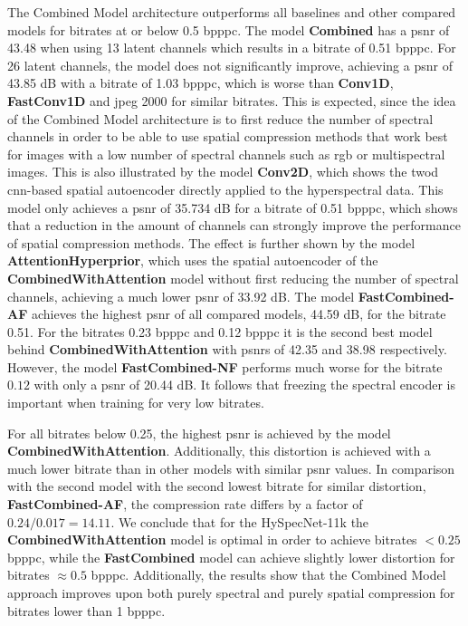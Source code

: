 The Combined Model architecture outperforms all baselines and other compared models for bitrates at or below 0.5 \ac{bpppc}. The model \textbf{Combined} has a \ac{psnr} of 43.48 when using 13 latent channels which results in a bitrate of 0.51 \ac{bpppc}. For 26 latent channels, the model does not significantly improve, achieving a \ac{psnr} of 43.85 dB with a bitrate of 1.03 \ac{bpppc}, which is worse than \textbf{Conv1D}, \textbf{FastConv1D} and \ac{jpeg} 2000 for similar bitrates. This is expected, since the idea of the Combined Model architecture is to first reduce the number of spectral channels in order to be able to use spatial compression methods that work best for images with a low number of spectral channels such as \ac{rgb} or multispectral images. This is also illustrated by the model \textbf{Conv2D}, which shows the \ac{twod} \ac{cnn}-based spatial autoencoder directly applied to the hyperspectral data. This model only achieves a \ac{psnr} of 35.734 dB for a bitrate of 0.51 \ac{bpppc}, which shows that a reduction in the amount of channels can strongly improve the performance of spatial compression methods. The effect is further shown by the model \textbf{AttentionHyperprior}, which uses the spatial autoencoder of the \textbf{CombinedWithAttention} model without first reducing the number of spectral channels, achieving a much lower \ac{psnr} of 33.92 dB. The model \textbf{FastCombined-AF} achieves the highest \ac{psnr} of all compared models, 44.59 dB, for the bitrate 0.51. For the bitrates 0.23 \ac{bpppc} and 0.12 \ac{bpppc} it is the second best model behind \textbf{CombinedWithAttention} with \acp{psnr} of 42.35 and 38.98 respectively. However, the model \textbf{FastCombined-NF} performs much worse for the bitrate $0.12$ with only a \ac{psnr} of 20.44 dB. It follows that freezing the spectral encoder is important when training for very low bitrates.

For all bitrates below 0.25, the highest \ac{psnr} is achieved by the model \textbf{CombinedWithAttention}. Additionally, this distortion is achieved with a much lower bitrate than in other models with similar \ac{psnr} values. In comparison with the second model with the second lowest bitrate for similar distortion, \textbf{FastCombined-AF}, the compression rate differs by a factor of $0.24/0.017=14.11$. We conclude that for the HySpecNet-11k the \textbf{CombinedWithAttention} model is optimal in order to achieve bitrates $<0.25$ \ac{bpppc}, while the \textbf{FastCombined} model can achieve slightly lower distortion for bitrates $\approx 0.5$ \ac{bpppc}. Additionally, the results show that the Combined Model approach improves upon both purely spectral and purely spatial compression for bitrates lower than 1 \ac{bpppc}. 






